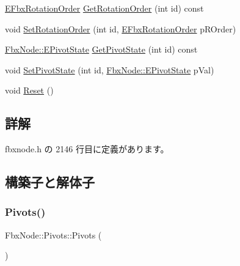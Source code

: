 \begin{DoxyCompactItemize}
\item 
\hyperlink{fbxmath_8h_ae46778666b56bb0abe5992b855fe9332}{E\+Fbx\+Rotation\+Order} \hyperlink{class_fbx_node_1_1_pivots_aab5f5f87a4eb865eeee4c232918677ef}{Get\+Rotation\+Order} (int id) const
\item 
void \hyperlink{class_fbx_node_1_1_pivots_a7f0f5d29498e70ed840a70c16cff355d}{Set\+Rotation\+Order} (int id, \hyperlink{fbxmath_8h_ae46778666b56bb0abe5992b855fe9332}{E\+Fbx\+Rotation\+Order} p\+R\+Order)
\item 
\hyperlink{class_fbx_node_a153fc75958227fc6728a2233b630b58a}{Fbx\+Node\+::\+E\+Pivot\+State} \hyperlink{class_fbx_node_1_1_pivots_a70917508966d4f14357fe678e1024eae}{Get\+Pivot\+State} (int id) const
\item 
void \hyperlink{class_fbx_node_1_1_pivots_abb34f894cdbda44914d8e707d7d7b737}{Set\+Pivot\+State} (int id, \hyperlink{class_fbx_node_a153fc75958227fc6728a2233b630b58a}{Fbx\+Node\+::\+E\+Pivot\+State} p\+Val)
\item 
void \hyperlink{class_fbx_node_1_1_pivots_ac7d51e9cdd4b9c8a384e94b8d868800c}{Reset} ()
\end{DoxyCompactItemize}


\subsection{詳解}


 fbxnode.\+h の 2146 行目に定義があります。



\subsection{構築子と解体子}
\mbox{\label{class_fbx_node_1_1_pivots_a41cd73917c09aaffe0af873d4e9d86b8}} 
\subsubsection{\texorpdfstring{Pivots()}{Pivots()}}
{\footnotesize\ttfamily Fbx\+Node\+::\+Pivots\+::\+Pivots (\begin{DoxyParamCaption}{ }\end{DoxyParamCaption})\hspace{0.3cm}{\ttfamily [inline]}}



